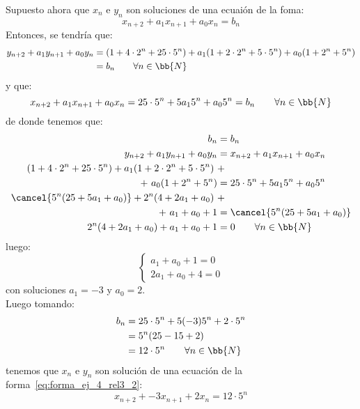 \begin{ejercicio}
    Supuesto ahora que $x_n$ e $y_n$ son soluciones de una ecuaión de la foma:
    \begin{equation}\label{eq:forma_ej_4_rel3_2}
        x_{n+2} + a_1 x_{n+1} + a_0 x_n = b_n
    \end{equation}
    Entonces, se tendría que:
    \begin{align*}
        y_{n+2} + a_1 y_{n+1} + a_0 y_n &= (1+4\cdot 2^n + 25\cdot 5^n) + a_1(1+2\cdot 2^n + 5\cdot 5^n) + a_0 (1 + 2^n + 5^n) \\
        &= b_n \qquad \forall n \in \bb{N}
    \end{align*}
    y que:
    \begin{equation*}
        x_{n+2} + a_1 x_{n+1} + a_0 x_n = 25\cdot 5^n + 5a_15^n + a_0 5^n = b_n \qquad \forall n \in \bb{N}
    \end{equation*}
    de donde tenemos que:
    \begin{align*}
        b_n &= b_n \\
        y_{n+2} + a_1y_{n+1} + a_0 y_n &= x_{n+2} + a_1x_{n+1} + a_0 x_n   \\
        (1+4\cdot 2^n + 25\cdot 5^n) + a_1(1+2\cdot 2^n + 5\cdot 5^n) \ &+ \\
        +\ a_0 (1 + 2^n + 5^n) &= 25\cdot 5^n + 5a_15^n + a_0 5^n \\
        \cancel{5^n(25+5a_1 + a_0)} + 2^n (4+2a_1 + a_0)\  &+ \\
        +\ a_1 + a_0 + 1 &= \cancel{5^n(25 + 5a_1 + a_0)} \\
        2^n (4+2a_1 + a_0) + a_1 + a_0 + 1 &= 0 \qquad \forall n \in \bb{N}
    \end{align*}
    luego:
    \begin{equation*}
        \left\{\begin{array}{l}
            a_1 + a_0 + 1 = 0 \\
            2a_1 + a_0 + 4 = 0
        \end{array}\right.
    \end{equation*}
    con soluciones $a_1 = -3$ y $a_0 = 2$.\\

    Luego tomando:
    \begin{align*}
        b_n &= 25\cdot 5^n + 5(-3)5^n + 2\cdot 5^n \\
        &= 5^n ( 25 -15 + 2) \\
        &= 12\cdot 5^n \qquad \forall n \in \bb{N}
    \end{align*}
    tenemos que $x_n$ e $y_n$ son solución de una ecuación de la forma~\ref{eq:forma_ej_4_rel3_2}:
    \begin{equation*}
        x_{n+2} + -3x_{n+1} + 2 x_n = 12\cdot 5^n
    \end{equation*}

\end{ejercicio}

